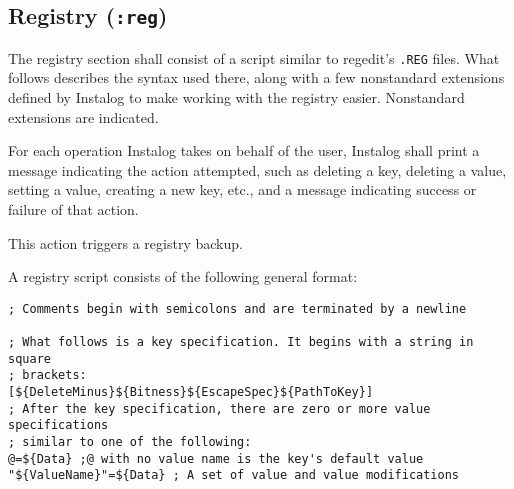 \subsection{Registry (\texttt{:reg})} \label{sec:registry}
The registry section shall consist of a script similar to regedit's \verb|.REG|
files. What follows describes the syntax used there, along with a few
nonstandard extensions defined by Instalog to make working with the registry
easier. Nonstandard extensions are indicated.

For each operation Instalog takes on behalf of the user, Instalog shall print a
message indicating the action attempted, such as deleting a key, deleting a
value, setting a value, creating a new key, etc., and a message indicating
success or failure of that action.

This action triggers a registry backup.

A registry script consists of the following general format:
\begin{verbatim}
; Comments begin with semicolons and are terminated by a newline

; What follows is a key specification. It begins with a string in square
; brackets:
[${DeleteMinus}${Bitness}${EscapeSpec}${PathToKey}]
; After the key specification, there are zero or more value specifications
; similar to one of the following:
@=${Data} ;@ with no value name is the key's default value
"${ValueName}"=${Data} ; A set of value and value modifications
\end{verbatim}

